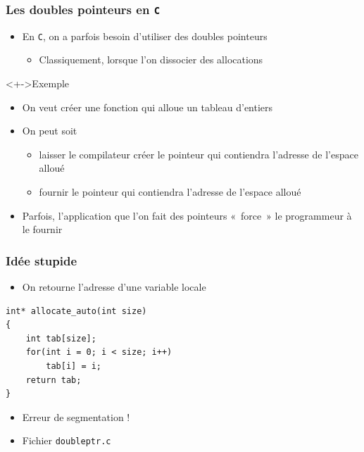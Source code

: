 \begin{frame}
\frametitle{Les doubles pointeurs en \texttt{C}}
\begin{itemize}[<+->]
\item En \texttt{C}, on a parfois besoin d'utiliser des doubles pointeurs
	\begin{itemize}
	\item Classiquement, lorsque l'on dissocier des allocations
	\end{itemize}
\end{itemize}
\begin{exampleblock}<+->{Exemple}
	\begin{itemize}[<+->]
	\item On veut créer une fonction qui alloue un tableau d'entiers
	\item On peut soit
		\begin{itemize}
		\item laisser le compilateur créer le pointeur qui contiendra l'adresse de l'espace alloué
		\item fournir le pointeur qui contiendra l'adresse de l'espace alloué		
		\end{itemize}
	\end{itemize}
\end{exampleblock}
\begin{itemize}[<+->]
\item Parfois, l'application que l'on fait des pointeurs «~force~» le programmeur à le fournir
\end{itemize}
\end{frame}

\begin{frame}[containsverbatim]
\frametitle{Idée stupide}
\begin{itemize}
\item On retourne l'adresse d'une variable locale
\end{itemize}
\begin{lstlisting}
int* allocate_auto(int size)
{
    int tab[size];
    for(int i = 0; i < size; i++)
		tab[i] = i;
    return tab;
}
\end{lstlisting}
\begin{itemize}
\item Erreur de segmentation !
\item Fichier \texttt{doubleptr.c}
\end{itemize}
\end{frame}


